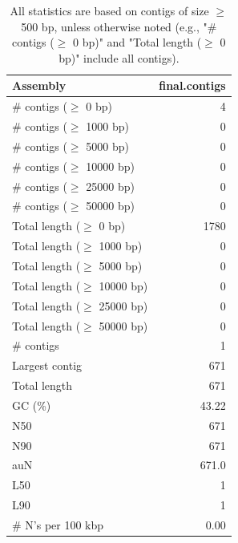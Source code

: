 \documentclass[12pt,a4paper]{article}
\begin{document}
\begin{table}[ht]
\begin{center}
\caption{All statistics are based on contigs of size $\geq$ 500 bp, unless otherwise noted (e.g., "\# contigs ($\geq$ 0 bp)" and "Total length ($\geq$ 0 bp)" include all contigs).}
\begin{tabular}{|l*{1}{|r}|}
\hline
Assembly & final.contigs \\ \hline
\# contigs ($\geq$ 0 bp) & 4 \\ \hline
\# contigs ($\geq$ 1000 bp) & 0 \\ \hline
\# contigs ($\geq$ 5000 bp) & 0 \\ \hline
\# contigs ($\geq$ 10000 bp) & 0 \\ \hline
\# contigs ($\geq$ 25000 bp) & 0 \\ \hline
\# contigs ($\geq$ 50000 bp) & 0 \\ \hline
Total length ($\geq$ 0 bp) & 1780 \\ \hline
Total length ($\geq$ 1000 bp) & 0 \\ \hline
Total length ($\geq$ 5000 bp) & 0 \\ \hline
Total length ($\geq$ 10000 bp) & 0 \\ \hline
Total length ($\geq$ 25000 bp) & 0 \\ \hline
Total length ($\geq$ 50000 bp) & 0 \\ \hline
\# contigs & 1 \\ \hline
Largest contig & 671 \\ \hline
Total length & 671 \\ \hline
GC (\%) & 43.22 \\ \hline
N50 & 671 \\ \hline
N90 & 671 \\ \hline
auN & 671.0 \\ \hline
L50 & 1 \\ \hline
L90 & 1 \\ \hline
\# N's per 100 kbp & 0.00 \\ \hline
\end{tabular}
\end{center}
\end{table}
\end{document}
